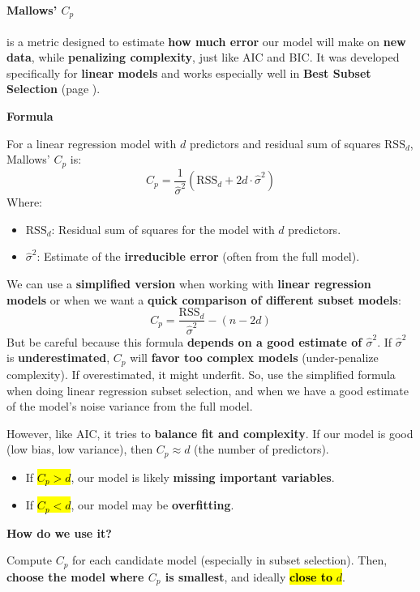 \paragraph{\texorpdfstring{Mallows' $C_p$}{Mallows' Cp}}\label{paragraph: Mallows' Cp}

 is a metric designed to estimate \textbf{how much error} our model will make on \textbf{new data}, while \textbf{penalizing complexity}, just like AIC and BIC. It was developed specifically for \textbf{linear models} and works especially well in \textbf{Best Subset Selection} (page \pageref{subsubsection: Best Subset Selection}).

\highspace
\begin{flushleft}
    \textcolor{Green3}{ \textbf{Formula}}
\end{flushleft}
For a linear regression model with $d$ predictors and residual sum of squares $\text{RSS}_d$, Mallows' $C_p$ is:
\begin{equation}
    C_p = \dfrac{1}{\hat{\sigma}^2} \left( \text{RSS}_d + 2d \cdot \hat{\sigma}^2 \right)
\end{equation}
Where:
\begin{itemize}
    \item $\text{RSS}_d$: Residual sum of squares for the model with $d$ predictors.
    \item $\hat{\sigma}^2$: Estimate of the \textbf{irreducible error} (often from the full model).
\end{itemize}
We can use a \textbf{simplified version} when working with \textbf{linear regression models} or when we want a \textbf{quick comparison of different subset models}:
\begin{equation*}
    C_p = \dfrac{\text{RSS}_d}{\hat{\sigma}^2} - \left(n - 2d\right)
\end{equation*}
But be careful because this formula \textbf{depends on a good estimate of $\hat{\sigma}^2$}. If $\hat{\sigma}^2$ is \textbf{underestimated}, $C_p$ will \textbf{favor too complex models} (under-penalize complexity). If overestimated, it might underfit. So, use the simplified formula when doing linear regression subset selection, and when we have a good estimate of the model's noise variance from the full model.

\highspace
However, like AIC, it tries to \textbf{balance fit and complexity}. If our model is good (low bias, low variance), then $C_p \approx d$ (the number of predictors).
\begin{itemize}
    \item If \hl{$C_p > d$}, our model is likely \textbf{missing important variables}.
    \item If \hl{$C_p < d$}, our model may be \textbf{overfitting}.
\end{itemize}

\highspace
\begin{flushleft}
    \textcolor{Green3}{ \textbf{How do we use it?}}
\end{flushleft}
Compute $C_p$ for each candidate model (especially in subset selection). Then, \textbf{choose the model where $C_p$ is smallest}, and ideally \hl{\textbf{close to} $d$}.